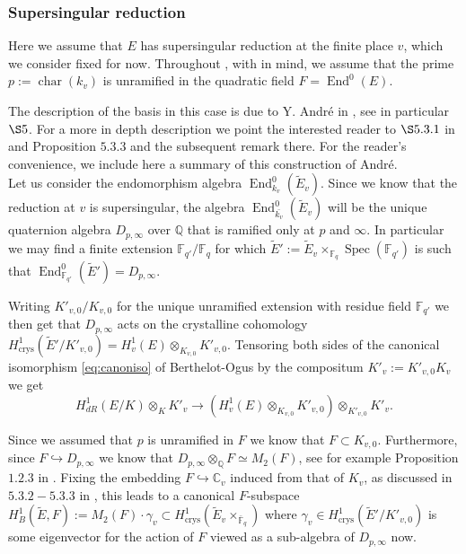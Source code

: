 \documentclass[12pt,twoside,a4paper]{article}
\theoremstyle{plain}%
\DeclareMathOperator{\End}{End}
\DeclareMathOperator{\spec}{Spec}
\DeclareMathOperator{\chara}{char}
\DeclareMathOperator{\crys}{crys}
\newcommand{\C}{\mathbb{C}}
\newcommand{\Q}{\mathbb{Q}}
\newcommand{\F}{\mathbb{F}}
\begin{document}
\subsubsection{Supersingular reduction}\label{section:supersingbases}

Here we assume that $E$ has supersingular reduction at the finite place $v$, which we consider fixed for now. Throughout , with  in mind, we assume that the prime $p:=\chara(k_v)$ is unramified in the quadratic field $F=\End^{0}(E)$. 

The description of the basis in this case is due to Y. Andr\'e in \cite{andremots}, see in particular $\S 5$. For a more in depth description we point the interested reader to $\S 5.3.1$ in \cite{andremsj} and Proposition $5.3.3$ and the subsequent remark there. For the reader's convenience, we include here a summary of this construction of Andr\'e.\\

Let us consider the endomorphism algebra $\End^{0}_{k_v}(\tilde{E}_v)$. Since we know that the reduction at $v$ is supersingular, the algebra $\End^{0}_{\bar{k_v}}(\tilde{E}_v)$ will be the unique quaternion algebra $D_{p,\infty}$ over $\Q$ that is ramified only at $p$ and $\infty$. In particular we may find a finite extension $\F_{q'}/\F_q$ for which $\tilde{E}':=\tilde{E}_{v}\times_{\F_q} \spec(\F_{q'})$ is such that $\End^{0}_{\F_{q'}}(\tilde{E}')=D_{p,\infty}$. 

Writing $K'_{v,0}/K_{v,0}$ for the unique unramified extension with residue field $\F_{q'}$ we then get that $D_{p,\infty}$ acts on the crystalline cohomology $H^1_{\crys}(\tilde{E}'/K'_{v,0})=H^1_{v}(E)\otimes_{K_{v,0}} K'_{v,0}$. Tensoring both sides of the canonical isomorphism \eqref{eq:canoniso} of Berthelot-Ogus by the compositum $K'_v:=K'_{v,0}K_v$ we get \begin{equation}
	H^1_{dR}(E/K)\otimes_{K} K'_v\rightarrow (H^1_{v}(E)\otimes_{K_{v,0}} K'_{v,0})\otimes_{K'_{v,0}} K'_{v}.
\end{equation}

Since we assumed that $p$ is unramified in $F$ we know that $F\subset K_{v,0}$. Furthermore, since $F\hookrightarrow D_{p,\infty}$ we know that $D_{p,\infty}\otimes_{\Q} F\simeq M_2(F)$, see for example Proposition $1.2.3$ in \cite{szamuely}. Fixing the embedding $F\hookrightarrow \C_v$ induced from that of $K_v$, as discussed in $5.3.2-5.3.3$ in \cite{andremsj}, this leads to a canonical $F$-subspace $H^1_B(\tilde{E},F):= M_2(F)\cdot \gamma_v\subset H^1_{\crys}(\tilde{E}_v\times_{\bar{\F}_{q}})$ where $\gamma_v\in H^1_{\crys}(\tilde{E}'/K'_{v,0})$ is some eigenvector for the action of $F$ viewed as a sub-algebra of $D_{p,\infty}$ now. 
\end{document}

